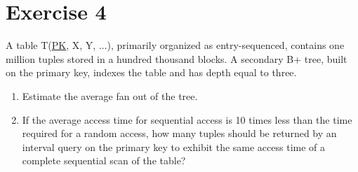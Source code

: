 \section{Exercise 4}

A table T(\underline{PK}, X, Y, $\dots$), primarily organized as entry-sequenced, contains one million tuples stored in a hundred thousand blocks. 
A secondary B+ tree, built on the primary key, indexes the table and has depth equal to three.
\begin{enumerate}
    \item Estimate the average fan out of the tree.
    \item If the average access time for sequential access is 10 times less than the time required for a random access, how many tuples should be returned by an interval query on the primary key to exhibit the same access time of a complete sequential scan of the table?
\end{enumerate}

